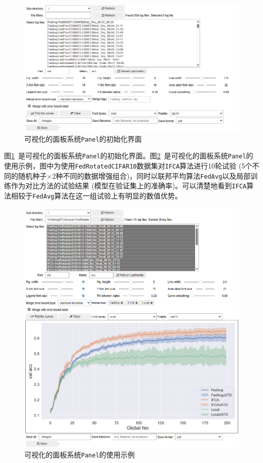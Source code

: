 \begin{figure}[ht]
    \centering
    \includegraphics[width=\textwidth]{figures/panel-init.png}
    \caption{可视化的面板系统\texttt{Panel}的初始化界面}
    \label{fig:panel-init}
\end{figure}

图\ref{fig:panel-init}~是可视化的面板系统\texttt{Panel}的初始化界面。图\ref{fig:panel-in-use}~是可视化的面板系统\texttt{Panel}的使用示例，图中为使用\texttt{FedRotatedCIFAR10}数据集对\texttt{IFCA}算法\cite{Ghosh_2022_cfl}进行10轮试验 (5个不同的随机种子$\times$2种不同的数据增强组合)，同时以联邦平均算法\texttt{FedAvg}以及局部训练作为对比方法的试验结果 (模型在验证集上的准确率)。可以清楚地看到\texttt{IFCA}算法相较于\texttt{FedAvg}算法在这一组试验上有明显的数值优势。

\begin{figure}[ht]
    \centering
    \includegraphics[width=\textwidth]{figures/panel-in-use.png}
    \caption{可视化的面板系统\texttt{Panel}的使用示例}
    \label{fig:panel-in-use}
\end{figure}
